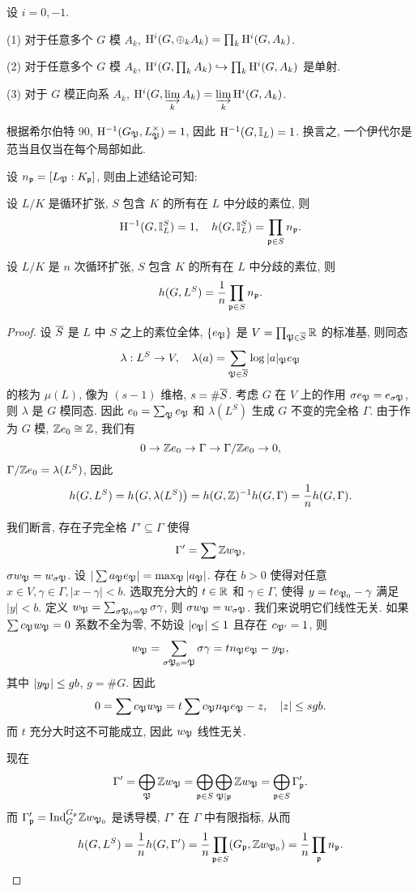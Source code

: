 \begin{exercise}
设 $i=0,-1$.

(1) 对于任意多个 $G$ 模 $A_k$, ${\mathrm{H}}^i(G,\oplus_k A_k)=\prod_k {\mathrm{H}}^i(G,A_k)$. 

(2) 对于任意多个 $G$ 模 $A_k$, ${\mathrm{H}}^i(G,\prod_k A_k)\hookrightarrow \prod_k {\mathrm{H}}^i(G,A_k)$ 是单射.

(3) 对于 $G$ 模正向系 $A_k$, ${\mathrm{H}}^i(G,\varinjlim\limits_k A_k)=\varinjlim\limits_k {\mathrm{H}}^i(G,A_k)$.
\end{exercise}


根据希尔伯特 90, ${\mathrm{H}}^{-1}(G_{\mathfrak{P}},L_{\mathfrak{P}}^\times)=1$, 因此 ${\mathrm{H}}^{-1}(G,{\mathbb{I}}_L)=1$. 换言之, 一个伊代尔是范当且仅当在每个局部如此.

设 $n_{\mathfrak{p}}=[L_{\mathfrak{P}}:K_{\mathfrak{p}}]$, 则由上述结论可知:
\begin{proposition}{}{}
设 $L/K$ 是循环扩张, $S$ 包含 $K$ 的所有在 $L$ 中分歧的素位, 则
  \[{\mathrm{H}}^{-1}(G,{\mathbb{I}}_L^S)=1,\quad h(G,{\mathbb{I}}_L^S)=\prod_{{\mathfrak{p}}\in S} n_{\mathfrak{p}}.\]
\end{proposition}
\begin{proposition}{}{}
设 $L/K$ 是 $n$ 次循环扩张, $S$ 包含 $K$ 的所有在 $L$ 中分歧的素位, 则
  \[h(G,L^S)=\frac{1}{n}\prod_{{\mathfrak{p}}\in S} n_{\mathfrak{p}}.\]
\end{proposition}
\begin{proof}
设 $\overline S$ 是 $L$ 中 $S$ 之上的素位全体, $\left\{e_{\mathfrak{P}}\right\}$ 是 $V=\prod_{{\mathfrak{P}}\in \overline S}{\mathbb{R}}$ 的标准基, 则同态
  \[\lambda:L^S\to V,\quad \lambda(a)=\sum_{{\mathfrak{P}}\in\overline S}\log|a|_{\mathfrak{P}} e_{\mathfrak{P}}\]
的核为 $\mu(L)$, 像为 $(s-1)$ 维格, $s=\#\overline S$. 考虑 $G$ 在 $V$ 上的作用 $\sigma e_{\mathfrak{P}}=e_{\sigma{\mathfrak{P}}}$, 则 $\lambda$ 是 $G$ 模同态. 因此 $e_0=\sum_{\mathfrak{P}} e_{\mathfrak{P}}$ 和 $\lambda(L^S)$ 生成 $G$ 不变的完全格 $\Gamma$. 由于作为 $G$ 模, ${\mathbb{Z}} e_0\cong{\mathbb{Z}}$, 我们有
  \[0\rightarrow {\mathbb{Z}} e_0\rightarrow \Gamma\rightarrow \Gamma/{\mathbb{Z}} e_0\rightarrow 0,\] 
$\Gamma/{\mathbb{Z}} e_0=\lambda(L^S)$, 因此
  \[h(G,L^S)=h\bigl(G,\lambda(L^S)\bigr)=h(G,{\mathbb{Z}})^{-1}h(G,\Gamma)=\frac{1}{n}h(G,\Gamma).\]

我们断言, 存在子完全格 $\Gamma'\subseteq \Gamma$ 使得
  \[\Gamma'=\sum {\mathbb{Z}} w_{\mathfrak{P}},\]
$\sigma w_{\mathfrak{P}}=w_{\sigma{\mathfrak{P}}}$.
设 $|\sum a_{\mathfrak{P}} e_{\mathfrak{P}}|=\max_{\mathfrak{P}} |a_{\mathfrak{P}}|$. 存在 $b>0$ 使得对任意 $x\in V,\gamma\in\Gamma,|x-\gamma|<b$. 选取充分大的 $t\in{\mathbb{R}}$ 和 $\gamma\in\Gamma$, 使得 $y=te_{{\mathfrak{P}}_0}-\gamma$ 满足 $|y|<b$.
定义 $w_{\mathfrak{P}}=\sum_{\sigma {\mathfrak{P}}_0={\mathfrak{P}}}\sigma \gamma$, 则 $\sigma w_{\mathfrak{P}}=w_{\sigma{\mathfrak{P}}}$. 我们来说明它们线性无关. 如果 $\sum c_{\mathfrak{P}} w_{\mathfrak{P}}=0$ 系数不全为零, 不妨设 $|c_{\mathfrak{P}}|\le 1$ 且存在 $c_{{\mathfrak{P}}'}=1$, 则 
  \[w_{\mathfrak{P}}=\sum_{\sigma{\mathfrak{P}}_0={\mathfrak{P}}} \sigma\gamma=tn_{\mathfrak{P}} e_{\mathfrak{P}}-y_{\mathfrak{P}},\] 
其中 $|y_{\mathfrak{P}}|\le gb$, $g=\#G$.
因此
  \[0=\sum c_{\mathfrak{P}} w_{\mathfrak{P}}=t\sum c_{\mathfrak{P}} n_{\mathfrak{P}} e_{\mathfrak{P}}-z,\quad |z|\le sgb.\]
而 $t$ 充分大时这不可能成立, 因此 $w_{\mathfrak{P}}$ 线性无关.

现在
  \[\Gamma'=\bigoplus_{\mathfrak{P}} {\mathbb{Z}} w_{\mathfrak{P}}=\bigoplus_{{\mathfrak{p}}\in S}\bigoplus_{{\mathfrak{P}}\mid{\mathfrak{p}}}{\mathbb{Z}} w_{\mathfrak{P}}=\bigoplus_{{\mathfrak{p}}\in S} \Gamma_{\mathfrak{p}}'.\]
而 $\Gamma_{\mathfrak{p}}'={\mathrm{Ind}}_G^{G_{\mathfrak{p}}}{\mathbb{Z}} w_{{\mathfrak{P}}_0}$ 是诱导模, $\Gamma'$ 在 $\Gamma$ 中有限指标, 从而
  \[h(G,L^S)=\frac{1}{n}h(G,\Gamma')=\frac{1}{n}\prod_{{\mathfrak{p}}\in S} (G_{\mathfrak{p}},{\mathbb{Z}} w_{{\mathfrak{P}}_0})=\frac{1}{n}\prod_{\mathfrak{p}} n_{\mathfrak{p}}.\]
\end{proof}

